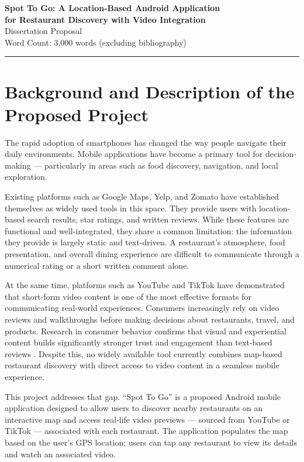 \documentclass[12pt, a4paper]{article}
\begin{document}
\begin{center}
    {\LARGE \textbf{Spot To Go: A Location-Based Android Application}} \\[0.5em]
    {\large \textbf{for Restaurant Discovery with Video Integration}} \\[1.5em]
    {\normalsize Dissertation Proposal} \\[0.3em]
    {\normalsize Word Count: 3,000 words (excluding bibliography)} \\[2em]
\end{center}

\hrule
\vspace{2em}

\section{Background and Description of the Proposed Project}

The rapid adoption of smartphones has changed the way people navigate their daily environments. Mobile applications have become a primary tool for decision-making — particularly in areas such as food discovery, navigation, and local exploration.

Existing platforms such as Google Maps, Yelp, and Zomato have established themselves as widely used tools in this space. They provide users with location-based search results, star ratings, and written reviews. While these features are functional and well-integrated, they share a common limitation: the information they provide is largely static and text-driven. A restaurant's atmosphere, food presentation, and overall dining experience are difficult to communicate through a numerical rating or a short written comment alone.

At the same time, platforms such as YouTube and TikTok have demonstrated that short-form video content is one of the most effective formats for communicating real-world experiences. Consumers increasingly rely on video reviews and walkthroughs before making decisions about restaurants, travel, and products. Research in consumer behavior confirms that visual and experiential content builds significantly stronger trust and engagement than text-based reviews \citep{dellarocas2003, cheung2009}. Despite this, no widely available tool currently combines map-based restaurant discovery with direct access to video content in a seamless mobile experience.

This project addresses that gap. ``Spot To Go'' is a proposed Android mobile application designed to allow users to discover nearby restaurants on an interactive map and access real-life video previews — sourced from YouTube or TikTok — associated with each restaurant. The application populates the map based on the user's GPS location; users can tap any restaurant to view its details and watch an associated video.
\end{document}
